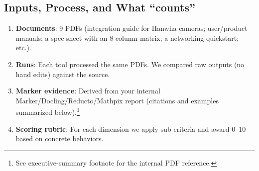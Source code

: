 \documentclass[11pt,a4paper]{article}
\begin{document}
\subsection*{Inputs, Process, and What “counts”}
\begin{enumerate}[leftmargin=1.2em]
  \item \textbf{Documents}: 9 PDFs (integration guide for Hanwha cameras; user/product manuals; a spec sheet with an 8-column matrix; a networking quickstart; etc.).
  \item \textbf{Runs}: Each tool processed the same PDFs. We compared raw outputs (no hand edits) against the source.
  \item \textbf{Marker evidence}: Derived from your internal Marker/Docling/Reducto/Mathpix report (citations and examples summarized below).\footnote{See executive-summary footnote for the internal PDF reference.}
  \item \textbf{Scoring rubric}: For each dimension we apply sub-criteria and award 0--10 based on concrete behaviors.
\end{enumerate}
\end{document}

